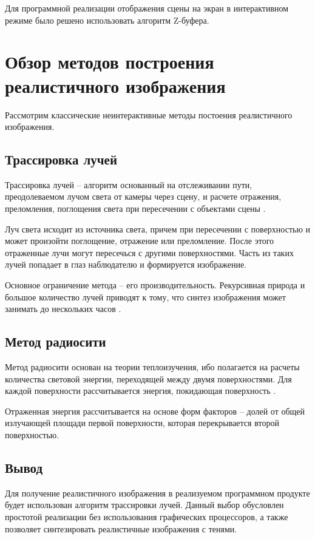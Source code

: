 Для программной реализации отображения сцены на экран в интерактивном режиме было решено использовать алгоритм Z-буфера.

\section{Обзор методов построения реалистичного изображения}

Рассмотрим классические неинтерактивные методы постоения реалистичного изображения.

\subsection{Трассировка лучей}

Трассировка лучей -- алгоритм основанный на отслеживании пути, преодолеваемом лучом света от камеры через сцену, и расчете отражения, преломления, поглощения света при пересечении с объектами сцены \cite{ray-tracing}.

Луч света исходит из источника света, причем при пересечении с поверхностью и может произойти поглощение, отражение или преломление. После этого отраженные лучи могут пересечься с другими поверхностями. Часть из таких лучей попадает в глаз наблюдателю и формируется изображение.

Основное ограничение метода -- его производительность. Рекурсивная природа и большое количество лучей приводят к тому, что синтез изображения может занимать до нескольких часов \cite{popov}.

\subsection{Метод радиосити}

Метод радиосити основан на теории теплоизучения, ибо полагается на расчеты количества световой энергии, переходящей между двумя поверхностями. Для каждой поверхности рассчитывается энергия, покидающая поверхность \cite{radiocity}.

Отраженная энергия рассчитывается на основе форм факторов -- долей от общей излучающей площади первой поверхности, которая перекрывается второй поверхностью.

\subsection{Вывод}

Для получение реалистичного изображения в реализуемом программном продукте будет использован алгоритм трассировки лучей. Данный выбор обусловлен простотой реализации без использования графических процессоров, а также позволяет синтезировать реалистичные изображения с тенями.
